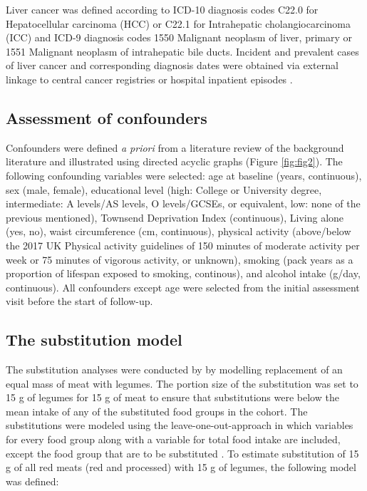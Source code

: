 \documentclass[nutrients,article,submit,moreauthors,pdftex]{Definitions/mdpi}
\begin{document}
Liver cancer was defined according to ICD-10 diagnosis codes C22.0 for
Hepatocellular carcinoma (HCC) or C22.1 for Intrahepatic
cholangiocarcinoma (ICC) and ICD-9 diagnosis codes 1550 Malignant
neoplasm of liver, primary or 1551 Malignant neoplasm of intrahepatic
bile ducts. Incident and prevalent cases of liver cancer and
corresponding diagnosis dates were obtained via external linkage to
central cancer registries or hospital inpatient episodes
\citep{RN112, RN114}.

\hypertarget{subsec4}{%
\subsection{Assessment of confounders}\label{subsec4}}

Confounders were defined \emph{a priori} from a literature review of the
background literature and illustrated using directed acyclic graphs
(Figure \ref{fig:fig2}). The following confounding variables were
selected: age at baseline (years, continuous), sex (male, female),
educational level (high: College or University degree, intermediate: A
levels/AS levels, O levels/GCSEs, or equivalent, low: none of the
previous mentioned), Townsend Deprivation Index (continuous), Living
alone (yes, no), waist circumference (cm, continuous), physical activity
(above/below the 2017 UK Physical activity guidelines of 150 minutes of
moderate activity per week or 75 minutes of vigorous activity, or
unknown), smoking (pack years as a proportion of lifespan exposed to
smoking, continous), and alcohol intake (g/day, continuous). All
confounders except age were selected from the initial assessment visit
before the start of follow-up.

\hypertarget{subsec5}{%
\subsection{The substitution model}\label{subsec5}}

The substitution analyses were conducted by by modelling replacement of
an equal mass of meat with legumes. The portion size of the substitution
was set to 15 g of legumes for 15 g of meat to ensure that substitutions
were below the mean intake of any of the substituted food groups in the
cohort. The substitutions were modeled using the leave-one-out-approach
in which variables for every food group along with a variable for total
food intake are included, except the food group that are to be
substituted \citep{Ibsen2021}. To estimate substitution of 15 g of all
red meats (red and processed) with 15 g of legumes, the following model
was defined:
\end{document}
